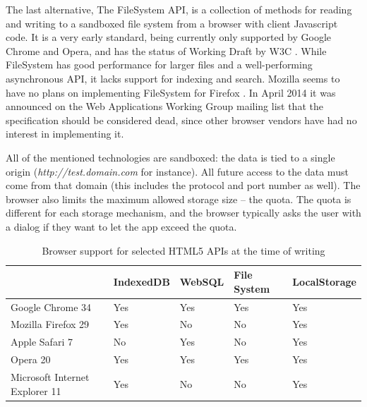The last alternative, The FileSystem API, is a collection of methods for reading and writing to a sandboxed file system from a browser with client Javascript code. It is a very early standard, being currently only supported by Google Chrome and Opera, and has the status of Working Draft by W3C \cite{FileSystem:Online}. While FileSystem has good performance for larger files and a well-performing asynchronous API, it lacks support for indexing and search. Mozilla seems to have no plans on implementing FileSystem for Firefox \cite{MozillaFileSystem:Online}. In April 2014 it was announced on the Web Applications Working Group mailing list that the specification should be considered dead, since other browser vendors have had no interest in implementing it\cite{FileSystemMailingList:Online}.

All of the mentioned technologies are sandboxed: the data is tied to a single origin (\emph{http://test.domain.com} for instance). All future access to the data must come from that domain (this includes the protocol and port number as well). The browser also limits the maximum allowed storage size – the quota. The quota is different for each storage mechanism, and the browser typically asks the user with a dialog if they want to let the app exceed the quota.

\begin{table}
    \begin{tabular}{|l|l|l|l|l|}
    \hline
                       & IndexedDB & WebSQL & File System & LocalStorage \\ \hline
    Google Chrome 34               & Yes       & Yes    & Yes  & Yes                      \\ \hline
    Mozilla Firefox 29             & Yes       & \cellcolor{red}No  & \cellcolor{red}No   & Yes                        \\ \hline
    Apple Safari 7                & \cellcolor{red}No        & Yes  & \cellcolor{red}No    & Yes                        \\ \hline
    Opera 20                       & Yes       & Yes    & Yes  & Yes                      \\ \hline
    Microsoft Internet Explorer 11 & Yes       & \cellcolor{red}No  & \cellcolor{red}No   & Yes                        \\ \hline
    \end{tabular}
    \caption {Browser support for selected HTML5 APIs at the time of writing}
\end{table}

